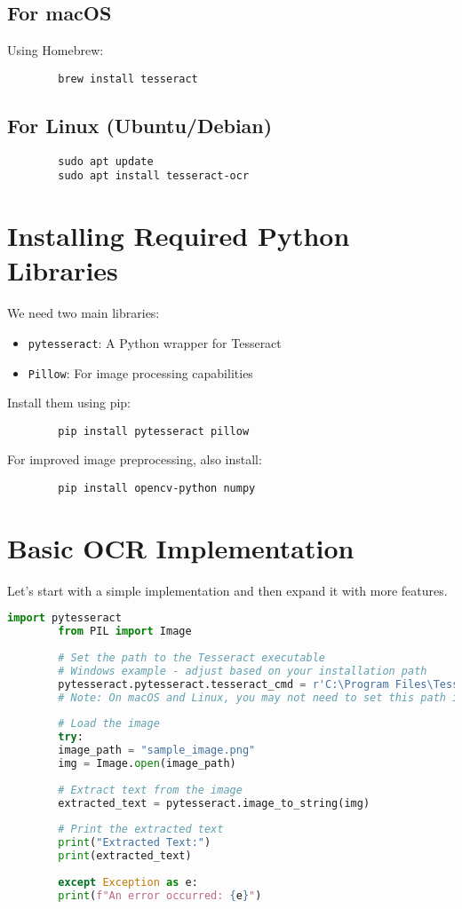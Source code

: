 \documentclass{book}
\begin{document}
	\subsection{For macOS}
	Using Homebrew:
	\begin{verbatim}
		brew install tesseract
	\end{verbatim}
	
	\subsection{For Linux (Ubuntu/Debian)}
	\begin{verbatim}
		sudo apt update
		sudo apt install tesseract-ocr
	\end{verbatim}
	
	\section{Installing Required Python Libraries}
	We need two main libraries:
	\begin{itemize}
		\item \texttt{pytesseract}: A Python wrapper for Tesseract
		\item \texttt{Pillow}: For image processing capabilities
	\end{itemize}
	
	Install them using pip:
	\begin{verbatim}
		pip install pytesseract pillow
	\end{verbatim}
	
	For improved image preprocessing, also install:
	\begin{verbatim}
		pip install opencv-python numpy
	\end{verbatim}
	
	\section{Basic OCR Implementation}
	Let's start with a simple implementation and then expand it with more features.
	
	\begin{lstlisting}[language=Python]
		import pytesseract
		from PIL import Image
		
		# Set the path to the Tesseract executable
		# Windows example - adjust based on your installation path
		pytesseract.pytesseract.tesseract_cmd = r'C:\Program Files\Tesseract-OCR\tesseract.exe'
		# Note: On macOS and Linux, you may not need to set this path if Tesseract is in your PATH
		
		# Load the image
		try:
		image_path = "sample_image.png"
		img = Image.open(image_path)
		
		# Extract text from the image
		extracted_text = pytesseract.image_to_string(img)
		
		# Print the extracted text
		print("Extracted Text:")
		print(extracted_text)
		
		except Exception as e:
		print(f"An error occurred: {e}")
	\end{lstlisting}
	
\end{document}
